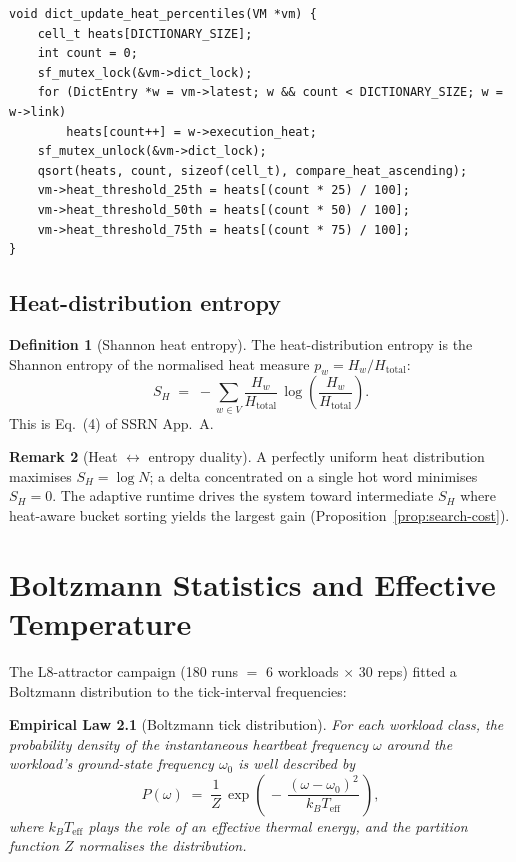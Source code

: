 \documentclass[11pt,letterpaper,openany]{book}
\theoremstyle{definition}
\newtheorem{definition}{Definition}[chapter]
\newtheorem{remark}[definition]{Remark}
\theoremstyle{plain}
\newtheorem{empiricallaw}[definition]{Empirical Law}
\newcommand{\Teff}{T_{\mathrm{eff}}}
\begin{document}
\begin{lstlisting}[caption={Percentile update (\texttt{src/dictionary\_heat\_optimization.c}:87--122).}]
void dict_update_heat_percentiles(VM *vm) {
    cell_t heats[DICTIONARY_SIZE];
    int count = 0;
    sf_mutex_lock(&vm->dict_lock);
    for (DictEntry *w = vm->latest; w && count < DICTIONARY_SIZE; w = w->link)
        heats[count++] = w->execution_heat;
    sf_mutex_unlock(&vm->dict_lock);
    qsort(heats, count, sizeof(cell_t), compare_heat_ascending);
    vm->heat_threshold_25th = heats[(count * 25) / 100];
    vm->heat_threshold_50th = heats[(count * 50) / 100];
    vm->heat_threshold_75th = heats[(count * 75) / 100];
}
\end{lstlisting}

\section{Heat-distribution entropy}

\begin{definition}[Shannon heat entropy]\label{def:heat-entropy}
The heat-distribution entropy is the Shannon entropy of the normalised
heat measure $p_w = H_w / H_{\mathrm{total}}$:
\begin{equation}\label{eq:heat-entropy}
  S_H \;=\; -\sum_{w\in V} \frac{H_w}{H_{\mathrm{total}}}\,
            \log\!\left(\frac{H_w}{H_{\mathrm{total}}}\right).
\end{equation}
This is Eq.~(4) of SSRN App.~A.
\end{definition}

\begin{remark}[Heat $\leftrightarrow$ entropy duality]
A perfectly uniform heat distribution maximises $S_H = \log N$;
a delta concentrated on a single hot word minimises $S_H = 0$. The
adaptive runtime drives the system toward intermediate $S_H$ where
heat-aware bucket sorting yields the largest gain
(Proposition~\ref{prop:search-cost}).
\end{remark}

\chapter{Boltzmann Statistics and Effective Temperature}
\label{ch:boltzmann}

The L8-attractor campaign (180 runs $=$ 6 workloads $\times$ 30 reps)
fitted a Boltzmann distribution to the tick-interval frequencies:

\begin{empiricallaw}[Boltzmann tick distribution]\label{law:boltzmann}
For each workload class, the probability density of the instantaneous
heartbeat frequency $\omega$ around the workload's ground-state frequency
$\omega_0$ is well described by
\begin{equation}\label{eq:boltzmann}
  P(\omega) \;=\; \frac{1}{Z}\,\exp\!\left(\,-\,\frac{(\omega-\omega_0)^2}{k_B \Teff}\,\right),
\end{equation}
where $k_B\Teff$ plays the role of an effective thermal energy, and the
partition function $Z$ normalises the distribution.
\end{empiricallaw}
\end{document}
